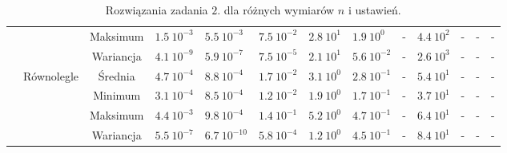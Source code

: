 \documentclass[11pt, a4paper, oneside]{article}
\begin{document}
\begin{table}[h]
\begin{adjustwidth}{0cm}{}
\begin{tabular}{|c|c|c|l|l|l|l|l|c|l|c|c|c|}
                      &                               & Maksimum  & $1.5 \ 10^{-3}$          & $5.5 \ 10^{-3}$         & $7.5 \ 10^{-2}$          & $2.8 \ 10^{1}$          & $1.9 \ 10^{0}$           & -                             & $4.4 \ 10^{2}$           & -                             & -                             & -                             \\ \cline{3-13} 
                      &                               & Wariancja & $4.1 \ 10^{-9}$          & $5.9 \ 10^{-7}$         & $7.5 \ 10^{-5}$          & $2.1 \ 10^{1}$          & $5.6 \ 10^{-2}$          & -                             & $2.6 \ 10^{3}$           & -                             & -                             & -                             \\ \cline{2-13} 
                      & \multirow{4}{*}{Równolegle}   & Średnia   & $4.7 \ 10^{-4}$          & $8.8 \ 10^{-4}$         & $1.7 \ 10^{-2}$          & $3.1 \ 10^{0}$          & $2.8 \ 10^{-1}$          & -                             & $5.4 \ 10^{1}$           & -                             & -                             & -                             \\ \cline{3-13} 
                      &                               & Minimum   & $3.1 \ 10^{-4}$          & $8.5 \ 10^{-4}$         & $1.2 \ 10^{-2}$          & $1.9 \ 10^{0}$          & $1.7 \ 10^{-1}$          & -                             & $3.7 \ 10^{1}$           & -                             & -                             & -                             \\ \cline{3-13} 
                      &                               & Maksimum  & $4.4 \ 10^{-3}$          & $9.8 \ 10^{-4}$         & $1.4 \ 10^{-1}$          & $5.2 \ 10^{0}$          & $4.7 \ 10^{-1}$          & -                             & $6.4 \ 10^{1}$           & -                             & -                             & -                             \\ \cline{3-13} 
                      &                               & Wariancja & $5.5 \ 10^{-7}$          & $6.7 \ 10^{-10}$        & $5.8 \ 10^{-4}$          & $1.2 \ 10^{0}$          & $4.5 \ 10^{-1}$          & -                             & $8.4 \ 10^{1}$           & -                             & -                             & -                             \\ \hline
\end{tabular}
\end{adjustwidth}
\caption{Rozwiązania zadania $2$. dla różnych wymiarów $n$ i ustawień.}
\label{tab:rozw_zad2}
\end{table}
\renewcommand{\arraystretch}{1}
\end{document}
